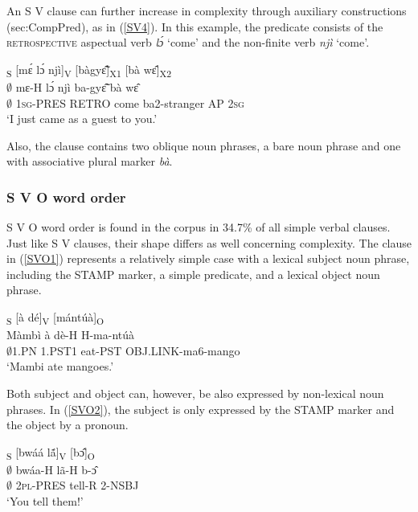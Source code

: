 An S V clause can further increase in complexity through auxiliary constructions ({sec:CompPred}), as in (\ref{SV4}).  In this example, the predicate consists of the \textsc{retrospective} aspectual verb {\itshape lɔ́} `come' and the non-finite verb {\itshape njì} `come'. 

\begin{exe} 
\ex\label{SV4}
  \glll [$\emptyset$]\textsubscript{S} [mɛ́ lɔ́ njì]\textsubscript{V} [bàgyɛ̃̂]\textsubscript{X1} [bà wɛ̂]\textsubscript{X2} \\
     $\emptyset$  mɛ-H lɔ́ njì ba-gyɛ̃̂ bà wɛ̂ \\
     $\emptyset$  1\textsc{sg}-PRES RETRO come ba2-stranger AP 2\textsc{sg}  \\
    \trans `I just came as a guest to you.'
\end{exe}

\noindent Also, the clause contains two oblique noun phrases, a bare noun phrase and one with associative plural marker {\itshape bà}.








\subsubsection{S V O word order}
\label{sec:SVO}


S V O word order is found in the corpus in 34.7\% of all simple verbal clauses. Just like S V clauses, their shape differs as well concerning complexity. The clause in (\ref{SVO1}) represents a relatively simple case with a lexical subject noun phrase, including the STAMP marker, a simple predicate, and a lexical object noun phrase.


\begin{exe}
\ex\label{SVO1}
  \glll  [Màmbì]\textsubscript{S} [à dé]\textsubscript{V} [mántúà]\textsubscript{O} \\
	Màmbì à dè-H H-ma-ntúà \\
         $\emptyset$1.PN 1.PST1 eat-PST OBJ.LINK-ma6-mango   \\
    \trans `Mambi ate mangoes.'
\end{exe}

Both subject and object can, however, be also expressed by non-lexical noun phrases. In (\ref{SVO2}), the subject is only expressed by the STAMP marker and the object by a pronoun. 

\begin{exe} 
\ex\label{SVO2}
  \glll  [$\emptyset$]\textsubscript{S} [bwáá lã́]\textsubscript{V} [bɔ̂]\textsubscript{O}  \\
         $\emptyset$ bwáa-H lã-H b-ɔ̂ \\
          $\emptyset$  2\textsc{pl}-PRES tell-R 2-NSBJ     \\
    \trans `You tell them!'
\end{exe}

